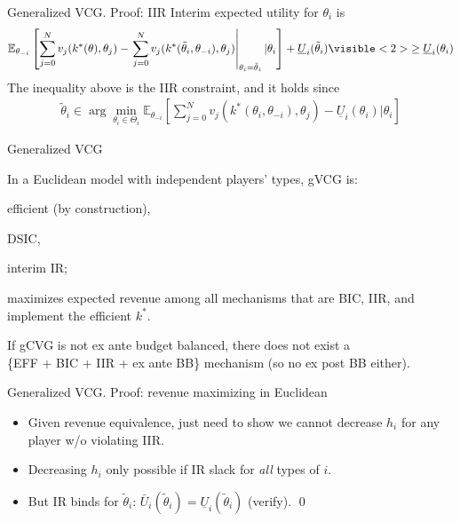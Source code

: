 \documentclass[english,10pt
,aspectratio=169
]{beamer}
\begin{document}
\begin{frame}{Generalized VCG. Proof: IIR}
	Interim expected utility for $\theta_i$ is
	\begin{align*}
		\mathbb{E}_{\theta_{-i}} \left[ \sum_{j =0}^N v_j (k^*(\theta),\theta_j) - \left. \sum_{j =0}^N v_j (k^*(\tilde{\theta}_i,\theta_{-i}),\theta_j) \right|_{\theta_i = \tilde{\theta}_i} | \theta_i \right] + \underline{U}_i (\tilde{\theta}_i)
		\visible<2>{
			\geq \underline{U}_i(\theta_i)
		}
	\end{align*}
	\pause
	The inequality above is the IIR constraint, and it holds since
	\begin{align*}
	\tilde{\theta}_i \in \arg \min_{\theta_i \in \Theta_i} \mathbb{E}_{\theta_{-i}} \left[ \sum_{j=0}^{N} v_j (k^*(\theta_i,\theta_{-i}),\theta_j) - \underline{U}_i (\theta_i) | \theta_i \right]
	\end{align*}
\end{frame}


\begin{frame}{Generalized VCG}
	\begin{theorem}
		In a \alert{Euclidean} model with independent players' types, gVCG is:
		\begin{itemize}{\color{gray}
				\item efficient (by construction),
				\item DSIC,
				\item interim IR;}
			\item maximizes expected revenue among all mechanisms that are BIC, IIR, and implement the efficient $k^*$.
		\end{itemize}
	\end{theorem}
	If gCVG is not ex ante budget balanced, there does not exist a \\
	\{EFF + BIC + IIR + ex ante BB\} mechanism (so no ex post BB either).
\end{frame}


\begin{frame}{Generalized VCG. Proof: revenue maximizing in Euclidean}
\begin{itemize}
	\item Given revenue equivalence, just need to show we cannot decrease $h_i$ for any player w/o violating IIR.
	\pause
	\item Decreasing $h_i$ only possible if IR slack for \emph{all} types of $i$.
	\pause
	\item But IR binds for $\tilde{\theta}_i$: $\bar{U}_i (\tilde{\theta}_i) = \underline{U}_i (\tilde{\theta}_i)$ (verify). \qed
\end{itemize}
\end{frame}
\end{document}
